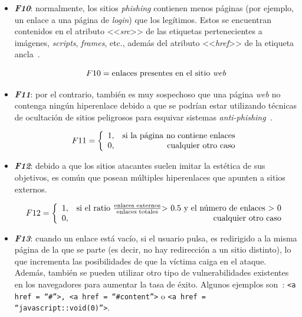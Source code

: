 \begin{itemize}
	\item \textit{\textbf{F10}}: normalmente, los sitios \textit{phishing} contienen menos páginas (por ejemplo, un enlace a una página de \textit{login}) que los legítimos. Estos se encuentran contenidos en el atributo <<\textit{src}>> de las etiquetas pertenecientes a imágenes, \textit{scripts}, \textit{frames}, etc., además del atributo <<\textit{href}>> de la etiqueta ancla~\cite{anclaMozilla}.
	
	\begin{equation}\label{eqn:phishing_f10} F10 = \text{enlaces presentes en el sitio \textit{web}} \end{equation}
		
	\item \textit{\textbf{F11}}: por el contrario, también es muy sospechoso que una página \textit{web} no contenga ningún hiperenlace debido a que se podrían estar utilizando técnicas de ocultación de sitios peligrosos para esquivar sistemas \textit{anti-phishing}~\cite{hiperlinkHidingTechniques}.

	\[F11 = \left\{ \begin{array}{lr} 1, & \text{si la página no contiene enlaces}\\ 
	0, & \text{\raggedright cualquier otro caso} \label{eqn:phishing_f11} \end{array}\right.\]
	
	\item \textit{\textbf{F12}}: debido a que los sitios atacantes suelen imitar la estética de sus objetivos, es común que posean múltiples hiperenlaces que apunten a sitios externos.

	\[F12 = \left\{ \begin{array}{lr} 1, & \text{si el ratio } \frac{\text{enlaces externos}}{\text{enlaces totales}} \text{> 0.5 y el número de enlaces > 0} \\
	0, & \text{\raggedright cualquier otro caso} \label{eqn:phishing_f12} \end{array}\right.\]


	\item \textit{\textbf{F13}}: cuando un enlace está vacío, si el usuario pulsa, es redirigido a la misma página de la que se parte (es decir, no hay redirección a un sitio distinto), lo que incrementa las posibilidades de que la víctima caiga en el ataque. Además, también se pueden utilizar otro tipo de vulnerabilidades existentes en los navegadores para aumentar la tasa de éxito. Algunos ejemplos son~\cite{featuresPhishing2018Gupta}: \texttt{<a href = “\#”>, <a href = “\#content”>} o \texttt{<a href = “javascript::void(0)”>}.


\end{itemize}
